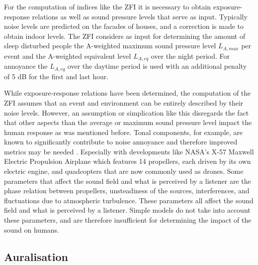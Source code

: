 For the computation of indices like the ZFI it is necessary to obtain
exposure-response relations as well as sound pressure levels that serve as
input. Typically noise levels are predicted on the facades of houses, and a
correction is made to obtain indoor levels. The ZFI considers as input for
determining the amount of sleep disturbed people the A-weighted maximum sound
pressure level $L_{A,max}$ per event and the A-weighted equivalent level
$L_{A,eq}$ over the night period. For annoyance the $L_{A,eq}$ over the daytime
period is used with an additional penalty of 5 dB for the first and last hour.

While exposure-response relations have been determined, the computation of the
ZFI assumes that an event and environment can be entirely described by their
noise levels. However, an assumption or simplication like this disregards the
fact that other aspects than the average or maximum sound pressure level impact
the human response as was mentioned before. Tonal components, for example, are
known to significantly contribute to noise annoyance and therefore improved
metrics may be needed \cite{Sahai2016,Sahai2016b}. Especially with developments
like NASA's X-57 Maxwell Electric Propulsion Airplane
\cite{Moore2012,Beutel2016} which features 14 propellers, each driven by its own
electric engine, and quadcopters \cite{Rizzi2015} that are now commonly used as
drones. Some parameters that affect the sound field and what is perceived by a
listener are the phase relation between propellers, unsteadiness of the sources,
interferences, and fluctuations due to atmospheric turbulence. These parameters
all affect the sound field and what is perceived by a listener. Simple models do
not take into account these parameters, and are therefore insufficient for
determining the impact of the sound on humans.




\subsection{Auralisation}\label{sec:introduction:background:auralisation}%

